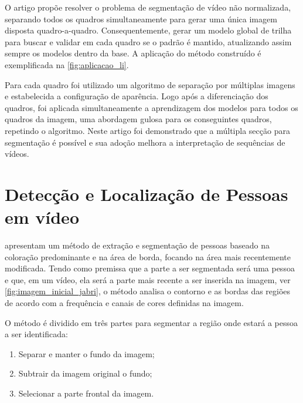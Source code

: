 \documentclass[12pt,oneside,a4paper,chapter=TITLE,section=TITLE,sumario=tradicional]{abntex2}
\begin{document}
O artigo propõe resolver o problema de segmentação de vídeo não normalizada, separando todos os quadros simultaneamente para gerar uma única imagem disposta quadro-a-quadro. Consequentemente, gerar um modelo global de trilha para buscar e validar em cada quadro se o padrão é mantido, atualizando assim sempre os modelos dentro da base. A aplicação do método construído é exemplificada na \autoref{fig:aplicacao_li}.

\begin{figure}[htb]
\end{figure}

Para cada quadro foi utilizado um algoritmo de separação por múltiplas imagens e estabelecida a configuração de aparência. Logo após a diferenciação dos quadros, foi aplicada simultaneamente a aprendizagem dos modelos para todos os quadros da imagem, uma abordagem gulosa para os conseguintes quadros, repetindo o algoritmo. Neste artigo foi demonstrado que a múltipla secção para segmentação é possível e sua adoção melhora a interpretação de sequências de vídeos.

\section{Detecção e Localização de Pessoas em vídeo}

 apresentam um método de extração e segmentação de pessoas baseado na coloração predominante e na área de borda, focando na área mais recentemente modificada. Tendo como premissa que a parte a ser segmentada será uma pessoa e que, em um vídeo, ela será a parte mais recente a ser inserida na imagem, ver \autoref{fig:imagem_inicial_jabri}, o método analisa o contorno e as bordas das regiões de acordo com a frequência e canais de cores definidas na imagem.

\begin{figure}[htb]
\end{figure}

O método é dividido em três partes para segmentar a região onde estará a pessoa a ser identificada:

\begin{enumerate}
    \item Separar e manter o fundo da imagem;
    \item Subtrair da imagem original o fundo;
    \item Selecionar a parte frontal da imagem.
\end{enumerate}
\end{document}
